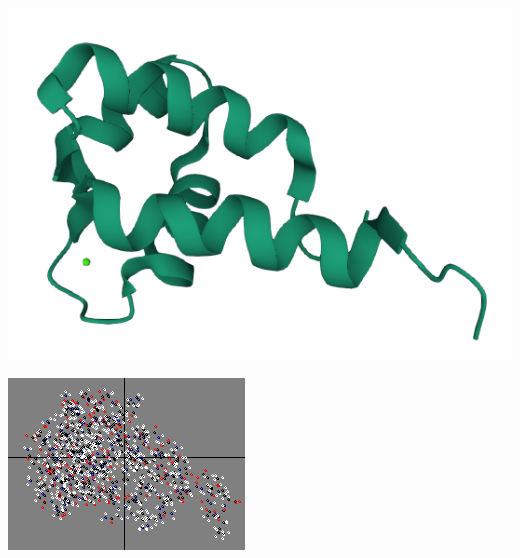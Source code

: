 \documentclass[10pt]{beamer}
\theoremstyle{plain}
\theoremstyle{definition}
\begin{document}
\begin{frame}
{			\begin{center}
				\begin{minipage}{0.08\linewidth}
					\hspace{0.1cm}
				\end{minipage}	
				\begin{minipage}{0.4\linewidth}
					\includegraphics[width=0.8\linewidth]{prot2.png}
				\end{minipage}
				\begin{minipage}{0.08\linewidth}
					\hspace{0.5cm}
				\end{minipage}
				\begin{minipage}{0.4\linewidth}
					\includegraphics[width=0.7\linewidth]{prot.png}
				\end{minipage}
			\end{center}
		}	
	\end{frame}
	
\end{document}
